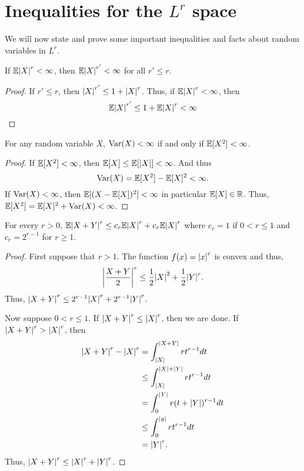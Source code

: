 \section{Inequalities for the $L^r$ space}
We will now state and prove some important inequalities and facts about random variables in $L^r$. 
\begin{proposition}
    If $\E\abs{X}^r < \infty$, then $\E\abs{X}^{r'} < \infty$ for all $r' \le r$.
\end{proposition}
\begin{proof}
    If $r'\le r$, then $\abs{X}^{r'} \le 1+\abs{X}^r$. Thus, if $\E\abs{X}^r < \infty$, then
    \[\E\abs{X}^{r'} \le 1+\E\abs{X}^r < \infty \qedhere  \]
\end{proof}
\begin{proposition}
    For any random variable $X$, $\V(X) < \infty$ if and only if $\E[X^2] < \infty$. 
\end{proposition}
\begin{proof}
    If $\E[X^2] < \infty$, then $\E[X] \le \E[\abs{X}] < \infty$. And thus 
    \[\V(X) = \E[X^2]-\E[X]^2 < \infty. \]
    If $\V(X)<\infty$, then $\E[(X-\E[X])^2] < \infty$ in particular $\E[X] \in \R$. Thus, $\E[X^2] = \E[X]^2+\V(X) < \infty$. 
\end{proof}
\begin{proposition}
    For every $r > 0$, $\E\abs{X+Y}^r \le c_r\E\abs{X}^r + c_r \E\abs{X}^r$ where $c_r = 1$ if $0 < r \le 1$ and $c_r=2^{r-1}$ for $r \ge 1$.
\end{proposition}
\begin{proof}
    First suppose that $r > 1$. The function $f(x) = \abs{x}^r$ is convex and thus,
    \[\abs{\frac{X+Y}{2}}^r \le \frac{1}{2}\abs{X}^2+\frac{1}{2}\abs{Y}^r.\]
    Thus, $\abs{X+Y}^r \le 2^{r-1}\abs{X}^r+2^{r-1}\abs{Y}^r$.

    Now suppose $0 < r\le 1$. If $\abs{X+Y}^r \le \abs{X}^r$, then we are done. If $\abs{X+Y}^r > \abs{X}^r$, then 
    \begin{align*}
        \abs{X+Y}^r - \abs{X}^r &= \int_{\abs{X}}^{\abs{X+Y}} rt^{r-1}dt\\
        &\le \int_\abs{X}^{\abs{X}+\abs{Y}} rt^{r-1}dt\\
        &=\int_0^\abs{Y} r(t+\abs{Y})^{r-1}dt\\
        &\le \int_0^\abs{y} rt^{r-1}dt\\
        &= \abs{Y}^r.
    \end{align*}
    Thus, $\abs{X+Y}^r \le \abs{X}^r+\abs{Y}^r$. 
\end{proof}
